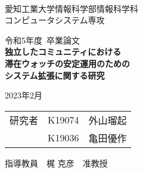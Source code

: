 \begin{titlepage}

  \ \\
  \begin{center}

    {\LARGE 愛知工業大学情報科学部情報科学科\\
      コンピュータシステム専攻

      \vspace{1.0cm}

      令和5年度~卒業論文\\

      \vspace{2.0cm}
      {\Huge
        \baselineskip=15mm
        \textbf{独立したコミュニティにおける\\滞在ウォッチの安定運用のための\\システム拡張に関する研究\\}}

      \vspace{7.0cm}

      2023年2月\\

      \vspace{1.0cm}

      \begin{tabular}[h]{lll}
        研究者 & K19074 & 外山瑠起 \\
            & K19036 & 亀田優作 \\
      \end{tabular}

      \vspace{1.0cm}

      指導教員\ \
      梶 克彦\ \
      准教授
    }

  \end{center}

\end{titlepage}
